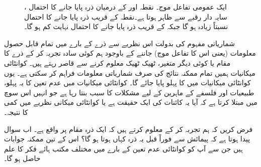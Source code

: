 \begin{figure}
\centering
{}
\caption{
ایک عمومی تفاعل موج۔ نقطہ  اور  کے درمیان  ذرہ پایا جانے کا احتمال ، سایہ دار رقبے سے ظاہر ہوتا ہے۔نقطہ  کے قریب ذرہ پایا جانے کا احتمال نسبتاً زیادہ ہو گا جبکہ  کے قریب ذرہ پایا جانے کا احتمال نہایت کم ہو گا۔
}
\label{شکل_تفاعل_موج_احتمال_اور_رقبہ}
\end{figure}
شماریاتی مفہوم کی  بدولت اس نظریے سے ذرے کے بارے میں تمام قابل حصول معلومات  (یعنی اس کا تفاعل موج) جاننے کے باوجود ہم کوئی سادہ تجربہ کر کے ذرے کا مقام یا کوئی دیگر متغیر،  ٹھیک ٹھیک معلوم کرنے سے قاصر رہتے ہیں۔ کوانٹائی میکانیات ہمیں تمام ممکنہ نتائج کی صرف شماریاتی معلومات فراہم کر سکتی ہے۔ یوں کوانٹائی میکانیات میں  کا پہلو پایا جائے گا۔ کوانٹائی میکانیات میں عدم تعین کا  یہ پہلو، طبیعیات اور فلسفے  کے ماہرین کے لیے مشکلات کا سبب بنتا رہا ہے جو انہیں اس سوچ میں مبتلا کرتا ہے کہ آیا یہ کائنات کی ایک حقیقت ہے یا کوانٹائی میکانی نظریے میں کمی کا نتیجہ۔

 فرض کریں کہ ہم  تجربہ کر کے معلوم کرتے ہیں کہ ایک ذرہ مقام  پر    واقع  ہے۔ اب سوال پیدا ہوتا ہے کہ پیمائش سے فوراً قبل یہ ذرہ کہاں ہوتا ہو گا؟ اس کے تین ممکنہ جوابات ہیں جن سے آپ کو کوانٹائی عدم تعین کے بارے میں مختلف مکتب ہائے فکر  کا  علم حاصل ہو گا۔  


